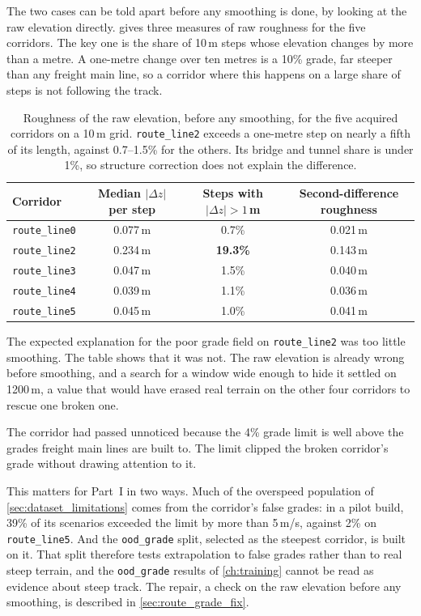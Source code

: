 The two cases can be told apart before any smoothing is done, by looking at the raw elevation directly.  gives three measures of raw roughness for the five corridors. The key one is the share of 10\,m steps whose elevation changes by more than a metre. A one-metre change over ten metres is a 10\% grade, far steeper than any freight main line, so a corridor where this happens on a large share of steps is not following the track.

\begin{table}[htbp]
    \centering
    \small
    \begin{tabular}{lccc}
        \toprule
        Corridor & Median $|\Delta z|$ per step & Steps with $|\Delta z| > 1$\,m & Second-difference roughness \\
        \midrule
        \texttt{route\_line0} & 0.077\,m & 0.7\% & 0.021\,m \\
        \texttt{route\_line2} & 0.234\,m & \textbf{19.3\%} & 0.143\,m \\
        \texttt{route\_line3} & 0.047\,m & 1.5\% & 0.040\,m \\
        \texttt{route\_line4} & 0.039\,m & 1.1\% & 0.036\,m \\
        \texttt{route\_line5} & 0.045\,m & 1.0\% & 0.041\,m \\
        \bottomrule
    \end{tabular}
    \caption{Roughness of the raw elevation, before any smoothing, for the five acquired corridors on a 10\,m grid. \texttt{route\_line2} exceeds a one-metre step on nearly a fifth of its length, against 0.7--1.5\% for the others. Its bridge and tunnel share is under 1\%, so structure correction does not explain the difference.}
    \label{tab:route_raw_qa}
\end{table}

The expected explanation for the poor grade field on \texttt{route\_line2} was too little smoothing. The table shows that it was not. The raw elevation is already wrong before smoothing, and a search for a window wide enough to hide it settled on 1200\,m, a value that would have erased real terrain on the other four corridors to rescue one broken one.

The corridor had passed unnoticed because the 4\% grade limit is well above the grades freight main lines are built to. The limit clipped the broken corridor's grade without drawing attention to it.

This matters for Part~I in two ways. Much of the overspeed population of \cref{sec:dataset_limitations} comes from the corridor's false grades: in a pilot build, 39\% of its scenarios exceeded the limit by more than 5\,m/s, against 2\% on \texttt{route\_line5}. And the \texttt{ood\_grade} split, selected as the steepest corridor, is built on it. That split therefore tests extrapolation to false grades rather than to real steep terrain, and the \texttt{ood\_grade} results of \cref{ch:training} cannot be read as evidence about steep track. The repair, a check on the raw elevation before any smoothing, is described in \cref{sec:route_grade_fix}.

